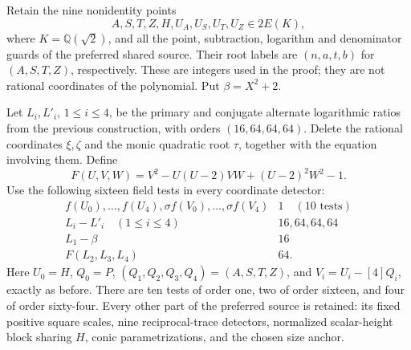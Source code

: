 \documentclass[11pt]{article}
\theoremstyle{definition}
\begin{document}
Retain the nine nonidentity points
\[
              A,S,T,Z,H,U_A,U_S,U_T,U_Z\in2E(K),
\]
where $K=\mathbb Q(\sqrt2)$, and all the point, subtraction,
logarithm and denominator guards of the preferred shared source.
Their root labels are $(n,a,t,b)$ for $(A,S,T,Z)$, respectively.
These are integers used in the proof; they are not rational
coordinates of the polynomial.  Put $\beta=X^2+2$.

Let $L_i,L'_i$, $1\le i\le4$, be the primary and conjugate
alternate logarithmic ratios from the previous construction,
with orders $(16,64,64,64)$.  Delete the rational coordinates
$\xi,\zeta$ and the monic quadratic root $\tau$, together with
the equation involving them.  Define
\[
 F(U,V,W)=V^2-U(U-2)VW+(U-2)^2W^2-1.
\]
Use the following sixteen field tests in every coordinate detector:
\[
\begin{array}{c|c}
 f(U_0),\ldots,f(U_4),\sigma f(V_0),\ldots,\sigma f(V_4)
       &1\quad(10\text{ tests})\\
 L_i-L'_i\quad(1\le i\le4)&16,64,64,64\\
 L_1-\beta&16\\
 F(L_2,L_3,L_4)&64.
\end{array}
\]
Here $U_0=H$, $Q_0=P$, $(Q_1,Q_2,Q_3,Q_4)=(A,S,T,Z)$,
and $V_i=U_i-[4]Q_i$, exactly as before.  There are ten tests
of order one, two of order sixteen, and four of order sixty-four.
Every other part of the preferred source is retained: its fixed
positive square scales, nine reciprocal-trace detectors, normalized
scalar-height block sharing $H$, conic parametrizations, and the
chosen size anchor.
\end{document}
